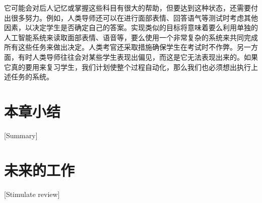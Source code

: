 它可能会对后人记忆或掌握这些科目有很大的帮助，但要达到这种状态，还需要付出很多努力。例如，人类导师还可以在进行面部表情、回答语气等测试时考虑其他因素，以决定学生是否确定自己的答案。实现类似的目标将意味着要么利用单独的人工智能系统来读取面部表情、语音等，要么使用一个非常复杂的系统来共同完成所有这些任务来做出决定。人类考官还采取措施确保学生在考试时不作弊。另一方面，有时人类导师往往会对某些学生表现出偏见，而这是它无法表现出来的。如果它真的要用来复习学生，我们计划使整个过程自动化，那么我们也必须想出执行上述任务的系统。

\section{本章小结}[Summary]

\section{未来的工作}[Stimulate review]